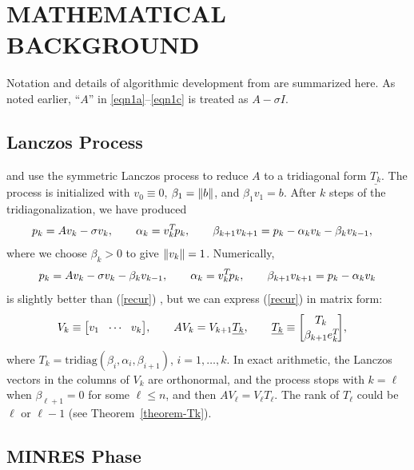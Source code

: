 \documentclass{doc_acmtrans2m}
\begin{document}
\section{MATHEMATICAL BACKGROUND}

Notation and details of algorithmic development from \cite{C06,CPS11}
are summarized here.  As noted earlier, ``$A$'' in \eqref{eqn1a}--\eqref{eqn1c}
is treated as $A - \sigma I$.

\subsection{Lanczos Process}

\MINRES and \MINRESQLP use the symmetric Lanczos process \cite{L50} to
reduce $A$ to a tridiagonal form $\underline{T_k}$. The process is
initialized with $v_0 \equiv 0$, $\beta_1 = \norm{b}$, and $\beta_1
v_1=b$.  After $k$ steps of the tridiagonalization, we have produced
\begin{align}
      p_k &= Av_k - \sigma v_k, \qquad \alpha_k = v_k\T p_k,
     \qquad \beta_{k+1}v_{k+1} = p_k-\alpha_kv_k-\beta_kv_{k-1},
   \label{recur}
\end{align}
where we choose $\beta_k > 0$ to give $\norm{v_k}=1$.
Numerically,
\begin{align*}
p_k = Av_k - \sigma v_k -\beta_kv_{k-1},
\qquad \alpha_k = v_k\T p_k, \qquad \beta_{k+1}v_{k+1}
= p_k - \alpha_k v_k
\end{align*}
is slightly better than (\ref{recur}) \cite{P76}, but we can express
(\ref{recur}) in matrix form:
\begin{align}
  V_k &\equiv  \bmat{v_1 & \!\cdots\! & v_k},
  \qquad AV_k = V_{k+1}\underline{T_k},
  \qquad \underline{T_k}  \equiv  \bmat{T_k \\ \beta_{k+1}e_k\T},
  \label{recur_matrix}
\end{align}
where $T_k = \textrm{tridiag}(\beta_i, \alpha_i, \beta_{i+1})$, $i=1,
\dots, k$.
In exact arithmetic, the Lanczos vectors in the columns of $V_k$ are
orthonormal, and the process stops with $k = \ell$ when
$\beta_{\ell+1}=0$ for some $\ell \le n$, and then $AV_\ell = V_\ell
T_\ell$. The rank of $T_\ell$ could be $\ell$ or $\ell-1$ (see
Theorem~\ref{theorem-Tk}).


\subsection{MINRES Phase}
\end{document}
